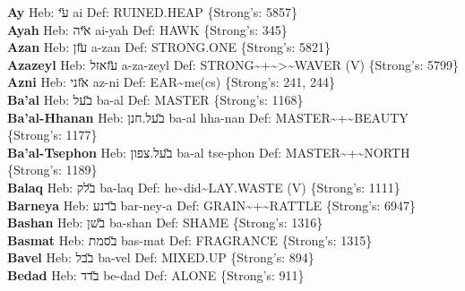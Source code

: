 {\textbf{Ay} Heb: {\large\H עי} ai Def: RUINED.HEAP \{Strong's: 5857\}\hfill{}\\

\textbf{Ayah} Heb: {\large\H איה} ai-yah Def: HAWK \{Strong's: 345\}\hfill{}\\

\textbf{Azan} Heb: {\large\H עזן} a-zan Def: STRONG.ONE \{Strong's: 5821\}\hfill{}\\

\textbf{Azazeyl} Heb: {\large\H עזאזל} a-za-zeyl Def: STRONG\textasciitilde{}+\textasciitilde{}>\textasciitilde{}WAVER (V) \{Strong's: 5799\}\hfill{}\\

\textbf{Azni} Heb: {\large\H אזני} az-ni Def: EAR\textasciitilde{}me(cs) \{Strong's: 241, 244\}\hfill{}\\

\textbf{Ba'al} Heb: {\large\H בעל} ba-al Def: MASTER \{Strong's: 1168\}\hfill{}\\

\textbf{Ba'al-Hhanan} Heb: {\large\H בעל.חנן} ba-al hha-nan Def: MASTER\textasciitilde{}+\textasciitilde{}BEAUTY \{Strong's: 1177\}\hfill{}\\

\textbf{Ba'al-Tsephon} Heb: {\large\H בעל.צפון} ba-al tse-phon Def: MASTER\textasciitilde{}+\textasciitilde{}NORTH \{Strong's: 1189\}\hfill{}\\

\textbf{Balaq} Heb: {\large\H בלק} ba-laq Def: he\textasciitilde{}did\textasciitilde{}LAY.WASTE (V) \{Strong's: 1111\}\hfill{}\\

\textbf{Barneya} Heb: {\large\H ברנע} bar-ney-a Def: GRAIN\textasciitilde{}+\textasciitilde{}RATTLE \{Strong's: 6947\}\hfill{}\\

\textbf{Bashan} Heb: {\large\H בשן} ba-shan Def: SHAME \{Strong's: 1316\}\hfill{}\\

\textbf{Basmat} Heb: {\large\H בסמת} bas-mat Def: FRAGRANCE \{Strong's: 1315\}\hfill{}\\

\textbf{Bavel} Heb: {\large\H בבל} ba-vel Def: MIXED.UP \{Strong's: 894\}\hfill{}\\

\textbf{Bedad} Heb: {\large\H בדד} be-dad Def: ALONE \{Strong's: 911\}\hfill{}\\

}
